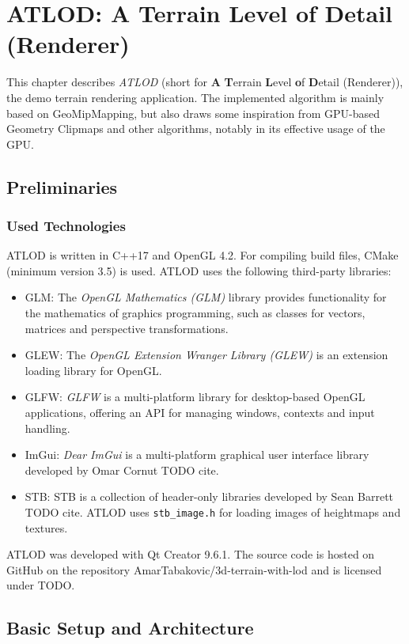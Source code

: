 \chapter{ATLOD: A Terrain Level of Detail (Renderer)}
This chapter describes \textit{ATLOD} (short for \textbf{A} \textbf{T}errain \textbf{L}evel \textbf{o}f \textbf{D}etail (Renderer)), the demo terrain rendering application.
The implemented algorithm is mainly based on GeoMipMapping, but also draws some inspiration from GPU-based Geometry Clipmaps and other algorithms,
notably in its effective usage of the GPU. 

\section{Preliminaries}
\subsection{Used Technologies}
ATLOD is written in C++17 and OpenGL 4.2.
For compiling build files, CMake (minimum version 3.5) is used.
ATLOD uses the following third-party libraries:
\begin{itemize}
  \item GLM: The \textit{OpenGL Mathematics (GLM)} library provides functionality for the mathematics of graphics programming, such as classes for vectors, matrices and perspective transformations.
  \item GLEW: The \textit{OpenGL Extension Wranger Library (GLEW)} is an extension loading library for OpenGL. 
  \item GLFW: \textit{GLFW} is a multi-platform library for desktop-based OpenGL applications, offering an API for managing windows, contexts and input handling.
  \item ImGui: \textit{Dear ImGui} is a multi-platform graphical user interface library developed by Omar Cornut TODO cite.
  \item STB: STB is a collection of header-only libraries developed by Sean Barrett TODO cite. ATLOD uses \texttt{stb\_image.h} for loading images of heightmaps and textures.
\end{itemize}

ATLOD was developed with Qt Creator 9.6.1. The source code is hosted on GitHub on the repository AmarTabakovic/3d-terrain-with-lod
and is licensed under TODO.

\section{Basic Setup and Architecture}
